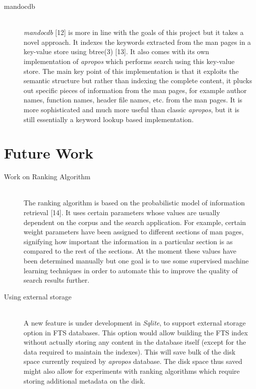 \documentclass[letterpaper,twocolumn,10pt]{article}
\begin{document}
\begin{description}
\item[mandocdb] \hfill \\
\textit{mandocdb} [12] is more in line with the goals of this project but it
takes a novel approach. It indexes the keywords extracted from the man pages in a
key-value store using btree(3) [13]. It also comes with its own implementation
of \textit{apropos} which performs search using this key-value store. The
main key point of this implementation is that it exploits the semantic structure
but rather than indexing the complete content, it plucks out specific pieces of
information from the man pages, for example author names, function names,
header file names, etc.
from the man pages. It is more sophisticated and much more useful than classic
\textit{apropos}, but it is still essentially a keyword lookup based
implementation.
\end{description}


\section{Future Work}
\begin{description}
\item[Work on Ranking Algorithm] \hfill \\
The ranking algorithm is based on the probabilistic model of information
retrieval [14]. It
uses certain parameters whose values are usually dependent on the corpus and the
search application. For example, certain weight parameters have been assigned to
different sections of man pages, signifying how important the information in a
particular section is as compared to the rest of the sections. At the moment
these values have been determined
manually but one goal is to use some supervised machine learning techniques in
order to automate this to improve the quality of search results further.
\end{description}

\begin{description}
\item[Using external storage] \hfill \\
A new feature is under development in \textit{Sqlite}, to support external
storage option in FTS databases. This option would allow building the FTS
index without actually storing any content in the database itself (except for
the data required to maintain the indexes). This will save bulk of the disk
space currently required by \textit{apropos} database. The disk space thus
saved might also allow for experiments with ranking algorithms which require
storing additional metadata on the disk.
\end{description}
\end{document}

